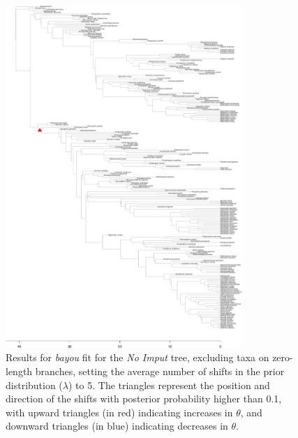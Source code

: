 \begin{figure}[H]
\includegraphics[width=0.8\textwidth]{img/plots-noimput-k5-1.pdf}
\caption{Results for \textit{bayou} fit for the \textit{No Imput} tree, excluding taxa on zero-length branches, setting the average number of shifts in the prior distribution ($\lambda$) to 5. The triangles represent the position and direction of the shifts with posterior probability higher than 0.1, with upward triangles (in red) indicating increases in $\theta$, and downward triangles (in blue) indicating decreases in $\theta$.}
\label{fig:noimput-k5-nzlb}
\end{figure}

\newpage

